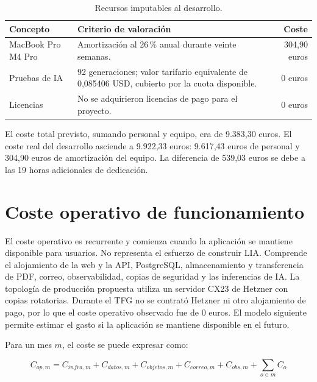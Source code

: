 \begin{table}[H]
  \centering
  \small
  \caption{Recursos imputables al desarrollo.}
  \label{tab:development-resources-cost}
  \begin{tabular}{@{}p{3.5cm}p{7.5cm}r@{}}
    \toprule
    \textbf{Concepto} & \textbf{Criterio de valoración} & \textbf{Coste} \\
    \midrule
    MacBook Pro M4 Pro & Amortización al 26\,\% anual durante veinte semanas. & 304,90 euros \\
    Pruebas de IA & 92 generaciones; valor tarifario equivalente de 0,085406 USD, cubierto por la cuota disponible. & 0 euros \\
    Licencias & No se adquirieron licencias de pago para el proyecto. & 0 euros \\
    \bottomrule
  \end{tabular}
\end{table}

El coste total previsto, sumando personal y equipo, era de 9{.}383,30 euros. El
coste real del desarrollo asciende a 9{.}922,33 euros: 9{.}617,43 euros de
personal y 304,90 euros de amortización del equipo. La diferencia de 539,03
euros se debe a las 19 horas adicionales de dedicación.

\section{Coste operativo de funcionamiento}
\label{sec:operational-cost}

El coste operativo es recurrente y comienza cuando la aplicación se mantiene
disponible para usuarios. No representa el esfuerzo de construir LIA. Comprende
el alojamiento de la web y la API, PostgreSQL, almacenamiento y transferencia
de PDF, correo, observabilidad, copias de seguridad y las inferencias de IA.
La topología de producción propuesta utiliza un servidor CX23 de Hetzner con
copias rotatorias. Durante el TFG no se contrató Hetzner ni otro alojamiento de
pago, por lo que el coste operativo observado fue de 0 euros. El modelo
siguiente permite estimar el gasto si la aplicación se mantiene disponible en
el futuro.

Para un mes $m$, el coste se puede expresar como:

\begin{equation}
  C_{op,m} = C_{infra,m} + C_{datos,m} + C_{objetos,m} + C_{correo,m}
  + C_{obs,m} + \sum_{o \in m} C_o
\end{equation}

